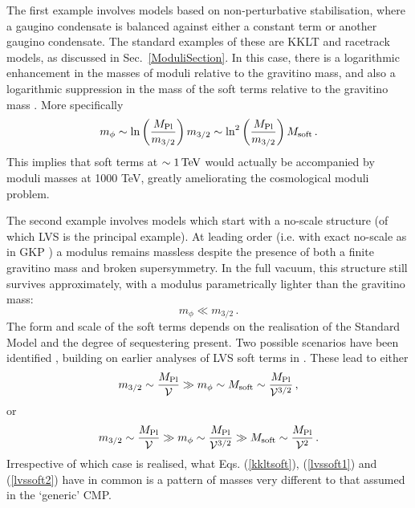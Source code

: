The first example involves models based on non-perturbative stabilisation, where a gaugino condensate is balanced against either a constant term or another gaugino condensate. The standard examples of these are KKLT and racetrack models, as discussed in Sec.~\ref{ModuliSection}. In this case, there is a logarithmic enhancement in the masses of moduli relative to the gravitino mass, and also a logarithmic suppression in the mass of the soft terms relative to the gravitino mass \cite{hepth0411066, hepth0503216, hepph0702146}. More specifically
\begin{equation}
m_\phi \sim \ln \left( \frac{M_{\rm Pl}}{m_{3/2}} \right) m_{3/2} \sim \ln^2 \left( \frac{M_{\rm Pl}}{m_{3/2}} \right) M_{\rm soft}\,.
\label{kkltsoft}
\end{equation}
This implies that soft terms at $\sim 1 \, \rm{TeV}$ would actually be accompanied by moduli masses at 1000 TeV, greatly ameliorating the cosmological moduli problem.

The second example involves models which start with a no-scale structure (of which LVS is the principal example). At leading order (i.e. with exact no-scale as in GKP \cite{Giddings:2001yu}) a modulus remains massless despite the presence of both a finite gravitino mass and broken supersymmetry. In the full vacuum, this structure still survives 
approximately, with a modulus parametrically lighter than the gravitino mass:
\begin{equation}
m_\phi \ll m_{3/2}\,.
\label{noscalemass}
\end{equation}
The form and scale of the soft terms depends on the realisation of the Standard Model and the degree of sequestering present. Two possible scenarios have been identified \cite{Blumenhagen:2009gk, Aparicio:2014wxa, Reece:2015qbf}, building on earlier analyses of LVS soft terms in \cite{hepth0605141, hepth0609180, hepth0610129}. These lead to either  
\begin{equation}
m_{3/2} \sim \frac{M_{\rm Pl}}{\mathcal{V}} \gg m_\phi \sim M_{\rm soft} \sim \frac{M_{\rm Pl}}{\mathcal{V}^{3/2}}\,,
\label{lvssoft1}
\end{equation}
or
\begin{equation}
m_{3/2} \sim \frac{M_{\rm Pl}}{\mathcal{V}} \gg m_\phi  \sim \frac{M_{\rm Pl}}{\mathcal{V}^{3/2}} \gg M_{\rm soft} \sim \frac{M_{\rm Pl}}{\mathcal{V}^2}\,.
\label{lvssoft2}
\end{equation}
Irrespective of which case is realised, what Eqs. (\ref{kkltsoft}), (\ref{lvssoft1}) and (\ref{lvssoft2}) have in common is a pattern of masses very different to that assumed in the `generic' CMP.

